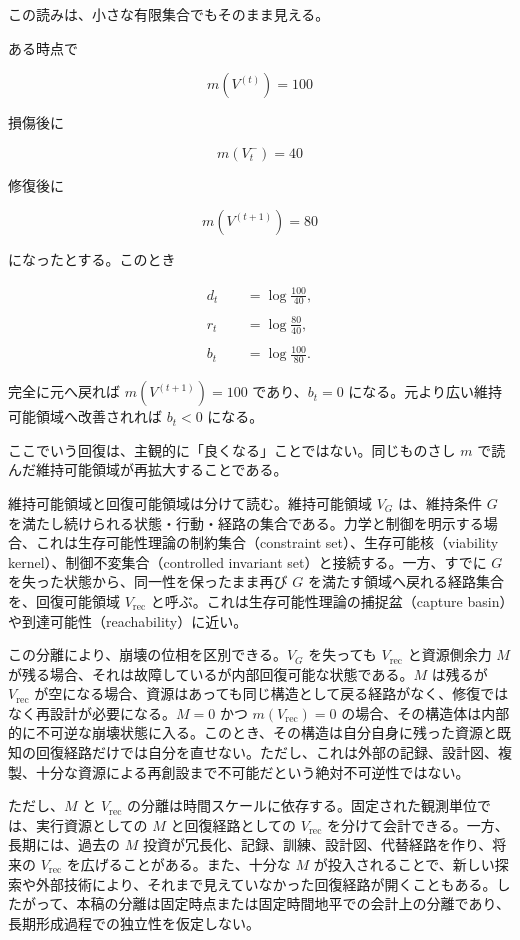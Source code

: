 \documentclass[12pt,a4paper]{article}
\begin{document}
この読みは、小さな有限集合でもそのまま見える。

ある時点で

\[
m(V^{(t)})=100
\]

損傷後に

\[
m(V_{t}^-)=40
\]

修復後に

\[
m(V^{(t+1)})=80
\]

になったとする。このとき

\[
\begin{aligned}
d_{t}&=\log\frac{100}{40}, \\
\qquad \\
r_{t}&=\log\frac{80}{40}, \\
\qquad \\
b_{t}&=\log\frac{100}{80}.
\end{aligned}
\]

完全に元へ戻れば \(m(V^{(t+1)})=100\) であり、\(b_{t}=0\) になる。元より広い維持可能領域へ改善されれば \(b_{t}<0\) になる。

ここでいう回復は、主観的に「良くなる」ことではない。同じものさし \(m\) で読んだ維持可能領域が再拡大することである。

維持可能領域と回復可能領域は分けて読む。維持可能領域 \(V_{G}\) は、維持条件 \(G\) を満たし続けられる状態・行動・経路の集合である。力学と制御を明示する場合、これは生存可能性理論の制約集合（constraint set）、生存可能核（viability kernel）、制御不変集合（controlled invariant set）と接続する。一方、すでに \(G\) を失った状態から、同一性を保ったまま再び \(G\) を満たす領域へ戻れる経路集合を、回復可能領域 \(V_{\mathrm{rec}}\) と呼ぶ。これは生存可能性理論の捕捉盆（capture basin）や到達可能性（reachability）に近い。

この分離により、崩壊の位相を区別できる。\(V_{G}\) を失っても \(V_{\mathrm{rec}}\) と資源側余力 \(M\) が残る場合、それは故障しているが内部回復可能な状態である。\(M\) は残るが \(V_{\mathrm{rec}}\) が空になる場合、資源はあっても同じ構造として戻る経路がなく、修復ではなく再設計が必要になる。\(M=0\) かつ \(m(V_{\mathrm{rec}})=0\) の場合、その構造体は内部的に不可逆な崩壊状態に入る。このとき、その構造は自分自身に残った資源と既知の回復経路だけでは自分を直せない。ただし、これは外部の記録、設計図、複製、十分な資源による再創設まで不可能だという絶対不可逆性ではない。

ただし、\(M\) と \(V_{\mathrm{rec}}\) の分離は時間スケールに依存する。固定された観測単位では、実行資源としての \(M\) と回復経路としての \(V_{\mathrm{rec}}\) を分けて会計できる。一方、長期には、過去の \(M\) 投資が冗長化、記録、訓練、設計図、代替経路を作り、将来の \(V_{\mathrm{rec}}\) を広げることがある。また、十分な \(M\) が投入されることで、新しい探索や外部技術により、それまで見えていなかった回復経路が開くこともある。したがって、本稿の分離は固定時点または固定時間地平での会計上の分離であり、長期形成過程での独立性を仮定しない。
\end{document}
